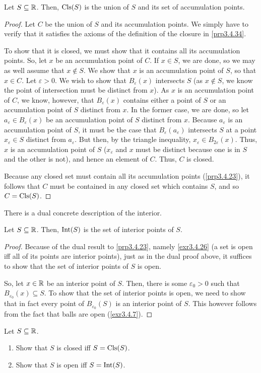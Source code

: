 \begin{prp}
Let $S\subseteq \mathbb{R}$.  Then, $\operatorname{Cls} (S)$ is the union of $S$ and its set of accumulation points.
\begin{proof}
Let $C$ be the union of $S$ and its accumulation points.  We simply have to verify that it satisfies the axioms of the definition of the closure in \cref{prp3.4.34}.

To show that it is closed, we must show that it contains all its accumulation points.  So, let $x$ be an accumulation point of $C$.  If $x\in S$, we are done, so we may as well assume that $x\notin S$.  We show that $x$ is an accumulation point of $S$, so that $x\in C$.  Let $\varepsilon >0$.  We wish to show that $B_\varepsilon (x)$ intersects $S$ (as $x\notin S$, we know the point of intersection must be distinct from $x$).  As $x$ is an accumulation point of $C$, we know, however, that $B_\varepsilon (x)$ contains either a point of $S$ or an accumulation point of $S$ distinct from $x$.  In the former case, we are done, so let $a_\varepsilon \in B_\varepsilon (x)$ be an accumulation point of $S$ distinct from $x$.  Because $a_\varepsilon$ is an accumulation point of $S$, it must be the case that $B_\varepsilon (a_\varepsilon )$ intersects $S$ at a point $x_\varepsilon \in S$ distinct from $a_\varepsilon$.  But then, by the triangle inequality, $x_\varepsilon \in B_{2\varepsilon}(x)$.  Thus, $x$ is an accumulation point of $S$ ($x_\varepsilon$ and $x$ must be distinct because one is in $S$ and the other is not), and hence an element of $C$.  Thus, $C$ is closed.

Because any closed set must contain all its accumulation points (\cref{prp3.4.23}), it follows that $C$ must be contained in any closed set which contains $S$, and so $C=\operatorname{Cls} (S)$.
\end{proof}
\end{prp}
There is a dual concrete description of the interior.
\begin{prp}
Let $S\subseteq \mathbb{R}$.  Then, $\operatorname{Int} (S)$ is the set of interior points of $S$.
\begin{proof}
Because of the dual result to \cref{prp3.4.23}, namely \cref{exr3.4.26} (a set is open iff all of its points are interior points), just as in the dual proof above, it suffices to show that the set of interior points of $S$ is open.

So, let $x\in \mathbb{R}$ be an interior point of $S$.  Then, there is some $\varepsilon _0>0$ such that $B_{\varepsilon _0}(x)\subseteq S$.  To show that the set of interior points is open, we need to show that in fact every point of $B_{\varepsilon _0}(S)$ is an interior point of $S$.  This however follows from the fact that balls are open (\cref{exr3.4.7}).
\end{proof}
\end{prp}
\begin{exr}
Let $S\subseteq \mathbb{R}$.
\begin{enumerate}
\item Show that $S$ is closed iff $S=\operatorname{Cls} (S)$.
\item Show that $S$ is open iff $S=\operatorname{Int} (S)$.
\end{enumerate}
\end{exr}

